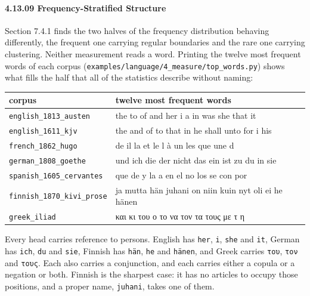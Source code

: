 \paragraph{4.13.09 Frequency-Stratified Structure}

Section 7.4.1 finds the two halves of the frequency distribution behaving differently, the frequent one carrying regular boundaries and the rare one carrying clustering. Neither measurement reads a word. Printing the twelve most frequent words of each corpus (\texttt{examples/\allowbreak{}language/\allowbreak{}4\_\allowbreak{}measure/\allowbreak{}top\_\allowbreak{}words.\allowbreak{}py}) shows what fills the half that all of the statistics describe without naming:

\tiny
\setlength{\tabcolsep}{2pt}
\begin{longtable}{@{}>{\raggedright\arraybackslash}p{}>{\raggedright\arraybackslash}p{}@{}}
\toprule
corpus & twelve most frequent words \\
\midrule
\texttt{english\_\allowbreak{}1813\_\allowbreak{}austen} & the to of and her i a in was she that it \\
\texttt{english\_\allowbreak{}1611\_\allowbreak{}kjv} & the and of to that in he shall unto for i his \\
\texttt{french\_\allowbreak{}1862\_\allowbreak{}hugo} & de il la et le l à un les que une d \\
\texttt{german\_\allowbreak{}1808\_\allowbreak{}goethe} & und ich die der nicht das ein ist zu du in sie \\
\texttt{spanish\_\allowbreak{}1605\_\allowbreak{}cervantes} & que de y la a en el no los se con por \\
\texttt{finnish\_\allowbreak{}1870\_\allowbreak{}kivi\_\allowbreak{}prose} & ja mutta hän juhani on niin kuin nyt oli ei he hänen \\
\texttt{greek\_\allowbreak{}iliad} & και κι του ο το να τον τα τους με τ η \\
\bottomrule
\end{longtable}
\normalsize

Every head carries reference to persons. English has \texttt{her}, \texttt{i}, \texttt{she} and \texttt{it}, German has \texttt{ich}, \texttt{du} and \texttt{sie}, Finnish has \texttt{hän}, \texttt{he} and \texttt{hänen}, and Greek carries \texttt{του}, \texttt{τον} and \texttt{τους}. Each also carries a conjunction, and each carries either a copula or a negation or both. Finnish is the sharpest case: it has no articles to occupy those positions, and a proper name, \texttt{juhani}, takes one of them.

